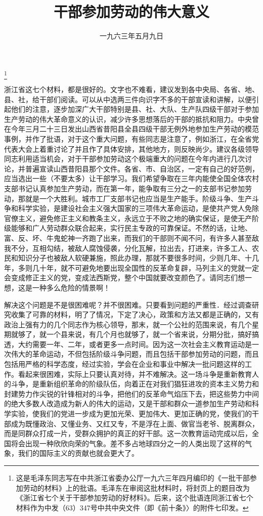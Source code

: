
\title{干部参加劳动的伟大意义}
\date{一九六三年五月九日}
\thanks{这是毛泽东同志写在中共浙江省委办公厅一九六三年四月编印的《一批干部参加劳动的材料》上的批语。毛泽东在审阅这批材料时，将封页上的题目改为《浙江省七个关于干部参加劳动的好材料》。后来，这个批语连同浙江省七个材料作为中发（63）347号中共中央文件（即《前十条》〉的附件七印发。}
\maketitle


浙江省这七个材料，都是很好的。文字也不难看，建议发到各中央局、各省、地、县、社，给干部们阅读。可以从中选两三件向识字不多的干部宣读和讲解，以便引起他们的注意，逐步加深广大干部特别是县、社、大队、生产队四级干部对于参加生产劳动的伟大革命意义的认识，减少许多思想落后的干部的抵抗和阻力。中央曾在今年三月二十三日发出山西省昔阳县全县四级干部无例外地参加生产劳动的模范事例，并作了批语，对于这个重大问题，有些同志是注意了，例如浙江，在全省党代表大会上着重讨论了并且作了具体安排，其他地方，则反映尚少。建议各级领导同志利用适当机会，对于干部参加劳动这个极端重大的问题在今年内进行几次讨论，并普遍宣读山西昔阳县那个文件。各省、市、自治区，一定有自己的好范例，应当选出一些（不要太多）让干部学习。我们希望争取在三年内能使全国全体农村支部书记认真参加生产劳动，而在第一年，能争取有三分之一的支部书记参加劳动，那就是一个大胜利。城市工厂支部书记也应当是生产能手。阶级斗争、生产斗争和科学实验，是建设社会主义强大国家的三项伟大革命运动，是使共产党人免除官僚主义，避免修正主义和教条主义，永远立于不败之地的确实保证，是使无产阶级能够和广人劳动群众联合起来，实行民主专政的可靠保证。不然的话，让地、富、反、坏、牛鬼蛇神一齐跑了出来，而我们的干部则不闻不问，有许多人甚至敌我不分，互相勾结，被敌人腐蚀侵袭，分化瓦解，拉出去，打进来，许多工人、农民和知识分子也被敌人软硬兼施，照此办理，那就不要很多时间，少则几年、十几年，多则几十年，就不可避免地要出现全国性的反革命复辟，马列主义的党就一定会变成修正主义的党，变成法西斯党，整个中国就要改变颜色了。请同志们想一想，这是一种多么危险的情景啊！

解决这个问题是不是很困难呢？并不很困难。只要看到问题的严重性．经过调查研究收集了可靠的材料，明了了情况，下定了决心，政策和方法又都是正确的，又有政治上强有力的几个同志作为核心领导，那末，就一个公社的范围来说，有几个星期就够了，就一个县来说，有几个月也就够了，就一个省来说，分期分批，搞好搞透，大约需要一年、二年，或者更多一点时间。因为这一次社会主义教育运动是一次伟大的革命运动，不但包括阶级斗争问题，而且包括干部参加劳动的问题，而且包括用严格的科学态度，经过实验，学会在企业和事业中解决一批问题这样的工作。看起来很困难，实际上只要认真对待，并不难解决。这一场斗争是重新教育人的斗争，是重新组织革命的阶级队伍，向着正在对我们猖狂进攻的资本主义势力和封建势力作尖锐的针锋相对的斗争，把他们的反革命气焰压下去，把这些势力中间的绝大多数人改造成为新人的伟大的运动，又是干部和群众一道参加生产劳动和科学实验，使我们的党进一步成为更加光荣、更加伟大、更加正确的党，使我们的干部成为既懂政治、又懂业务、又红又专，不是浮在上面、做官当老爷、脱离群众，而是同群众打成一片，受群众拥护的真正的好干部。这一次教育运动完成以后，全国将会出现一种欣欣向荣的气象。差不多占地球四分之一的人类出现了这样的气象，我们的国际主义的贡献也就会更大了。

